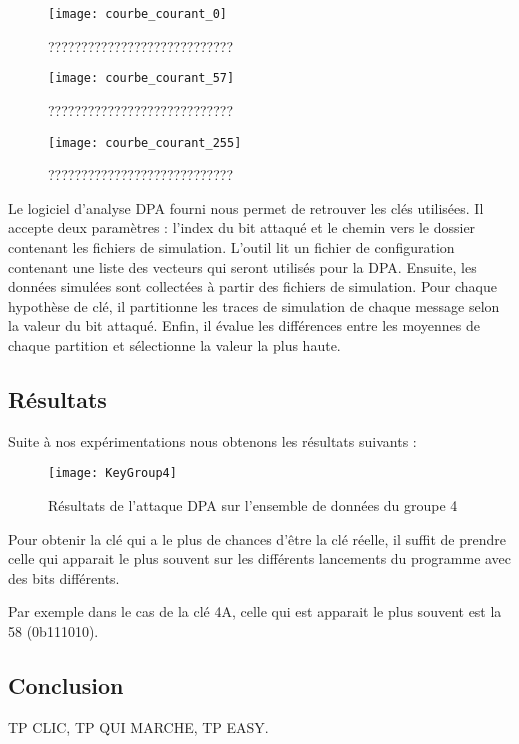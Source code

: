 \begin{figure}[h]
\texttt{[image: courbe\_courant\_0]}
\caption{ ???????????????????????????? }
\end{figure}

\begin{figure}[h]
\texttt{[image: courbe\_courant\_57]}
\caption{ ???????????????????????????? }
\end{figure}

\begin{figure}[h]
\texttt{[image: courbe\_courant\_255]}
\caption{ ???????????????????????????? }
\end{figure}

Le logiciel d'analyse DPA fourni nous permet de retrouver les clés utilisées.
Il accepte deux paramètres : l'index du bit attaqué et le chemin vers le
dossier contenant les fichiers de simulation.
L'outil lit un fichier de configuration contenant une liste des vecteurs qui
seront utilisés pour la DPA. Ensuite, les données simulées sont collectées à 
partir des fichiers de simulation. Pour chaque hypothèse de clé, il partitionne
les traces de simulation de chaque message selon la valeur du bit attaqué.
Enfin, il évalue les différences entre les moyennes de chaque partition et 
sélectionne la valeur la plus haute.


\subsection{Résultats}

Suite à nos expérimentations nous obtenons les résultats suivants :

\begin{figure}[h]
\texttt{[image: KeyGroup4]}
\caption{Résultats de l'attaque DPA sur l'ensemble de données du groupe 4}
\end{figure}

Pour obtenir la clé qui a le plus de chances d'être la clé réelle, il suffit 
de prendre celle qui apparait le plus souvent sur les différents lancements
du programme avec des bits différents.

Par exemple dans le cas de la clé 4A, celle qui est apparait le plus souvent est
la 58 (0b111010).

\subsection{Conclusion}

TP CLIC, TP QUI MARCHE, TP EASY.

